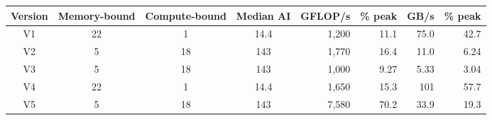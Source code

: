 \begin{tabular}{ccccrrrr}
\hline
\rowcolor{headgrey}
\textbf{Version} & \textbf{Memory-bound} & \textbf{Compute-bound} & \textbf{Median AI} & \textbf{GFLOP/s} & \textbf{\% peak} & \textbf{GB/s} & \textbf{\% peak} \\ \hline
V1 & 22 & 1 & 14.4 & 1{,}200 & 11.1 & 75.0 & 42.7 \\
V2 & 5 & 18 & 143 & 1{,}770 & 16.4 & 11.0 & 6.24 \\
V3 & 5 & 18 & 143 & 1{,}000 & 9.27 & 5.33 & 3.04 \\
V4 & 22 & 1 & 14.4 & 1{,}650 & 15.3 & 101 & 57.7 \\
V5 & 5 & 18 & 143 & 7{,}580 & 70.2 & 33.9 & 19.3 \\
\hline
\end{tabular}
